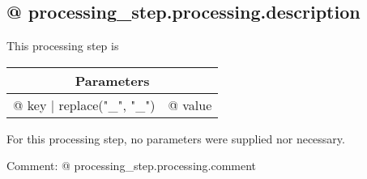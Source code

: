 \subsection{{@ processing_step.processing.description }}

This processing step is %

\vspace*{1ex}
\begin{tabular}{ll}
\toprule
\multicolumn{2}{c}{\textbf{Parameters}}
\\
\midrule
{@ key | replace("_", "\_") } & {@ value }
\\
\bottomrule
\end{tabular}
\vspace*{1ex}
For this processing step, no parameters were supplied nor necessary.

Comment: {@ processing_step.processing.comment }
